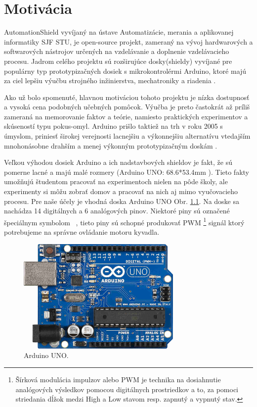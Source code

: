 \chapter{Motivácia}
AutomationShield vyvíjaný na ústave Automatizácie, merania a aplikovanej informatiky SJF STU, je open-source projekt, zameraný na vývoj hardwarových a softwarových nástrojov určených na vzdelávanie a doplnenie vzdelávacieho procesu. Jadrom celého projektu sú rozširujúce dosky(shieldy) vyvíjané pre populárny typ prototypizačných dosiek s mikrokontrolérmi Arduino, ktoré majú za ciel lepšiu výučbu strojného inžinierstva, mechatroniky a riadenia \cite{Auto}.

Ako už bolo spomenuté, hlavnou motiváciou tohoto projektu je nízka dostupnosť a vysoká cena podobných učebných pomôcok. Výučba je preto častokrát až príliš zameraná na memorovanie faktov a teórie, namiesto praktických experimentov a skúseností typu pokus-omyl. Arduino prišlo taktiež na trh v roku 2005 s úmyslom, priniesť širokej verejnosti lacnejšiu a výkonnejšiu alternatívu vtedajším mnohonásobne drahším a menej výkonným prototypizačným doskám \cite{stamp}.

Veľkou výhodou dosiek Arduino a ich nadstavbových shieldov je fakt, že sú pomerne lacné a majú malé rozmery (Arduino UNO: 68.6*53.4mm \cite{UNO} ). Tieto fakty umožňujú študentom pracovať na experimentoch nielen na pôde školy, ale experimenty si môžu zobrať domov a pracovať na nich aj mimo vyučovacieho procesu. Pre naše účely je vhodná doska Arduino UNO Obr. \ref{OBRAZOK 1.1}. Na doske sa nachádza 14 digitálnych a 6 analógových pinov. Niektoré piny sú označené špeciálnym symbolom ~, tieto piny sú schopné produkovať PWM \footnote[2]{Šírková modulácia impulzov alebo PWM je technika na dosiahnutie analógových výsledkov pomocou digitálnych prostriedkov a to, za pomoci striedania dĺžok medzi High a Low stavom resp. zapnutý a vypnutý stav.} signál ktorý potrebujeme na správne ovládanie motoru kyvadla.

\begin{figure}[!tbh]
\centering
\includegraphics[width=80mm]{obr/arduino.jpg}
\caption{Arduino UNO.}\label{OBRAZOK 1.1}
\end{figure}

